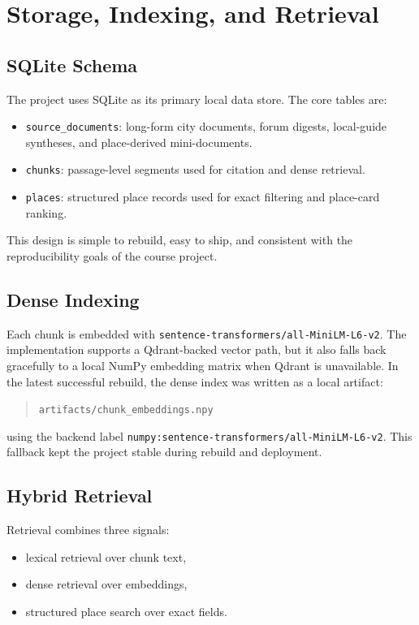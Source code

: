 \documentclass[11pt]{article}
\begin{document}
\section{Storage, Indexing, and Retrieval}
\subsection{SQLite Schema}
The project uses SQLite as its primary local data store. The core tables are:
\begin{itemize}[leftmargin=*]
    \item \texttt{source\_documents}: long-form city documents, forum digests, local-guide syntheses, and place-derived mini-documents.
    \item \texttt{chunks}: passage-level segments used for citation and dense retrieval.
    \item \texttt{places}: structured place records used for exact filtering and place-card ranking.
\end{itemize}

This design is simple to rebuild, easy to ship, and consistent with the reproducibility goals of the course project.

\subsection{Dense Indexing}
Each chunk is embedded with \texttt{sentence-transformers/all-MiniLM-L6-v2}. The implementation supports a Qdrant-backed vector path, but it also falls back gracefully to a local NumPy embedding matrix when Qdrant is unavailable. In the latest successful rebuild, the dense index was written as a local artifact:
\begin{quote}
\texttt{artifacts/chunk\_embeddings.npy}
\end{quote}
using the backend label \texttt{numpy:sentence-transformers/all-MiniLM-L6-v2}. This fallback kept the project stable during rebuild and deployment.

\subsection{Hybrid Retrieval}
Retrieval combines three signals:
\begin{itemize}[leftmargin=*]
    \item lexical retrieval over chunk text,
    \item dense retrieval over embeddings,
    \item structured place search over exact fields.
\end{itemize}
\end{document}
